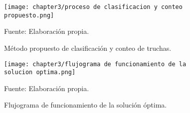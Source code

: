 \begin{landscape}
	\begin{figure}[H]
		\centering
		\texttt{[image: chapter3/proceso de clasificacion y conteo propuesto.png]}
		\caption{Método propuesto de clasificación y conteo de truchas.}%
		\begin{myflushleftportland}
			Fuente: Elaboración propia.
		\end{myflushleftportland}
		\label{fig:proceso de clasificacion y conteo propuesto}
	\end{figure}
\end{landscape}

\begin{landscape}
	\begin{figure}[H]
		\centering
		\texttt{[image: chapter3/flujograma de funcionamiento de la solucion optima.png]}
		\caption{Flujograma de funcionamiento de la solución óptima.}
		\begin{myflushleftportland}
			Fuente: Elaboración propia.
		\end{myflushleftportland}
		\label{fig:flujograma de funcionamiento de la solucion optima}
	\end{figure}
\end{landscape}










